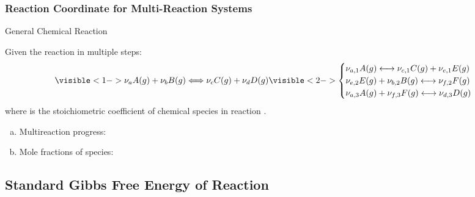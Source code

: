 \documentclass[10pt,compress,unknownkeysallowed]{beamer}
\begin{document}
\begin{frame}
  \frametitle{Reaction Coordinate for Multi-Reaction Systems}
  \begin{block}{\begin{center}General Chemical Reaction\end{center}}
        Given the reaction in multiple steps:
        \begin{displaymath}
           \visible<1->{\nu_{a}A(g) + \nu_{b}B(g) \Longleftrightarrow \nu_{c}C(g) + \nu_{d}D(g)}\visible<2->{ \begin{cases}
               \nu_{a,1}A(g) \longleftrightarrow \nu_{c,1}C(g) + \nu_{e,1}E(g) & \\
               \nu_{e,2}E(g) + \nu_{b,2}B(g) \longleftrightarrow \nu_{f,2}F(g) & \\
               \nu_{a,3}A(g) + \nu_{f,3}F(g) \longleftrightarrow \nu_{d,3}D(g) & 
           \end{cases}}
         \end{displaymath} 
         where  is the stoichiometric coefficient of chemical species  in reaction .
  \end{block}
        \begin{enumerate}[a)]%
           \item<3-> Multireaction progress:
           \item<4-> Mole fractions of species:     
        \end{enumerate}
\end{frame}
\normalsize


\subsection{Standard Gibbs Free Energy of Reaction}
\end{document}
